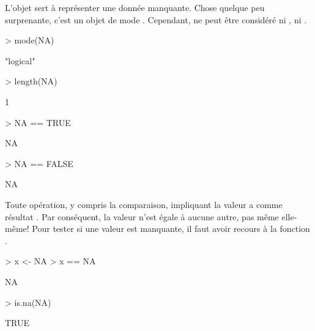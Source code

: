 L'objet  sert à représenter une donnée manquante. Chose
quelque peu surprenante, c'est un objet de mode . Cependant,
 ne peut être considéré ni , ni .
\begin{Schunk}
\begin{Sinput}
> mode(NA)
\end{Sinput}
\begin{Soutput}
[1] "logical"
\end{Soutput}
\begin{Sinput}
> length(NA)
\end{Sinput}
\begin{Soutput}
[1] 1
\end{Soutput}
\begin{Sinput}
> NA == TRUE
\end{Sinput}
\begin{Soutput}
[1] NA
\end{Soutput}
\begin{Sinput}
> NA == FALSE
\end{Sinput}
\begin{Soutput}
[1] NA
\end{Soutput}
\end{Schunk}
Toute opération, y compris la comparaison, impliquant la valeur
 a comme résultat . Par conséquent, la valeur
 n'est égale à aucune autre, pas même elle-même! Pour tester
si une valeur est manquante, il faut avoir recours à la fonction
.
\begin{Schunk}
\begin{Sinput}
> x <- NA
> x == NA
\end{Sinput}
\begin{Soutput}
[1] NA
\end{Soutput}
\begin{Sinput}
> is.na(NA)
\end{Sinput}
\begin{Soutput}
[1] TRUE
\end{Soutput}
\end{Schunk}

